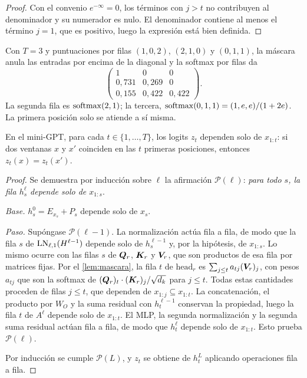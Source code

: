 \begin{proof}
Con el convenio $e^{-\infty}=0$, los términos con $j>t$ no contribuyen al denominador y su numerador es nulo. El denominador contiene al menos el término $j=1$, que es positivo, luego la expresión está bien definida.
\end{proof}

\begin{ejemplo}\label{ej:mascara}
Con $T=3$ y puntuaciones por filas $(1,0,2)$, $(2,1,0)$ y $(0,1,1)$, la máscara anula las entradas por encima de la diagonal y la softmax por filas da
\[
\begin{pmatrix}1&0&0\\ 0{,}731&0{,}269&0\\ 0{,}155&0{,}422&0{,}422\end{pmatrix}.
\]
La segunda fila es $\operatorname{softmax}(2,1)$; la tercera, $\operatorname{softmax}(0,1,1)=(1,e,e)/(1+2e)$. La primera posición solo se atiende a sí misma.
\end{ejemplo}

\begin{teorema}[Causalidad]\label{teo:causal}
En el mini-GPT, para cada $t\in\{1,\dots,T\}$, los logits $z_t$ dependen solo de $x_{1:t}$: si dos ventanas $x$ y $x'$ coinciden en las $t$ primeras posiciones, entonces $z_t(x)=z_t(x')$.
\end{teorema}

\begin{proof}
Se demuestra por inducción sobre $\ell$ la afirmación $\mathcal{P}(\ell)$: \emph{para todo $s$, la fila $h^{\ell}_s$ depende solo de $x_{1:s}$}.

\emph{Base.} $h^{0}_s=E_{x_s}+P_s$ depende solo de $x_s$.

\emph{Paso.} Supóngase $\mathcal{P}(\ell-1)$. La normalización actúa fila a fila, de modo que la fila $s$ de $\operatorname{LN}_{\ell,1}(H^{\ell-1})$ depende solo de $h^{\ell-1}_s$ y, por la hipótesis, de $x_{1:s}$. Lo mismo ocurre con las filas $s$ de $\bm{Q}_r$, $\bm{K}_r$ y $\bm{V}_r$, que son productos de esa fila por matrices fijas. Por el \cref{lem:mascara}, la fila $t$ de $\mathrm{head}_r$ es $\sum_{j\le t}a_{tj}(\bm{V}_r)_j$, con pesos $a_{tj}$ que son la softmax de $(\bm{Q}_r)_t\cdot(\bm{K}_r)_j/\sqrt{d_k}$ para $j\le t$. Todas estas cantidades proceden de filas $j\le t$, que dependen de $x_{1:j}\subseteq x_{1:t}$. La concatenación, el producto por $W_O$ y la suma residual con $h^{\ell-1}_t$ conservan la propiedad, luego la fila $t$ de $A^{\ell}$ depende solo de $x_{1:t}$. El MLP, la segunda normalización y la segunda suma residual actúan fila a fila, de modo que $h^{\ell}_t$ depende solo de $x_{1:t}$. Esto prueba $\mathcal{P}(\ell)$.

Por inducción se cumple $\mathcal{P}(L)$, y $z_t$ se obtiene de $h^{L}_t$ aplicando operaciones fila a fila.
\end{proof}


